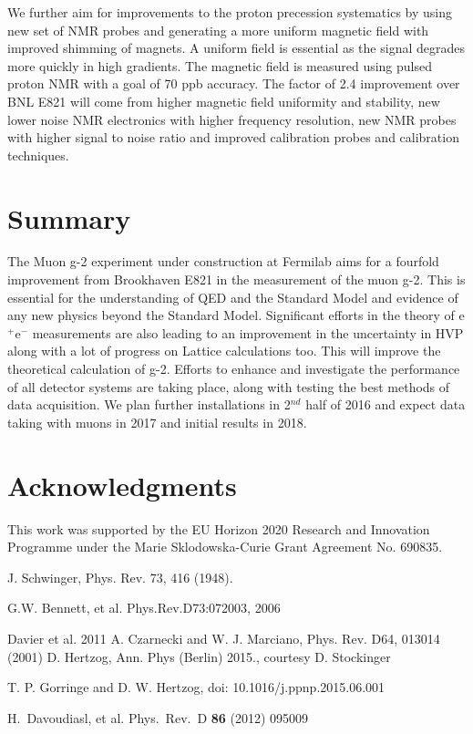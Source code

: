 \documentclass{article}
\begin{document}
We further aim for improvements to the proton precession systematics
by using new set of NMR probes and generating a more uniform magnetic
field with improved shimming of magnets.
A uniform field is essential as the signal degrades more quickly in high gradients. 
The magnetic field is measured using pulsed proton NMR with a goal of 70 ppb accuracy.
The factor of 2.4 improvement over BNL E821 will come from higher magnetic field uniformity and stability,
new lower noise NMR electronics with higher frequency resolution,
new NMR probes with higher signal to noise ratio 
and improved calibration probes and calibration techniques.
\section{Summary}
The Muon g-2 experiment under construction at Fermilab aims for a fourfold improvement from Brookhaven E821 
in the measurement of the muon g-2. This is essential for the understanding
of QED and the Standard Model and evidence of any new physics beyond the Standard Model. 
Significant efforts in the theory of e$^+$e$^-$ measurements are also leading to an
improvement in the uncertainty in HVP along with a lot of progress on Lattice
calculations too. This will improve the theoretical calculation of g-2. Efforts 
to enhance and investigate the performance of all detector systems are taking place,
along with testing the best methods of data acquisition. We plan further installations 
in 2$^{nd}$ half of 2016 and expect data taking with muons in 2017 and initial results
in 2018. 


\section*{Acknowledgments}
This work was supported by the EU Horizon 2020 Research and Innovation Programme under the
Marie Sklodowska-Curie Grant Agreement No. 690835.

\begin{thebibliography}{99}
J. Schwinger, Phys. Rev. 73, 416 (1948).
  
G.W. Bennett, et al. Phys.Rev.D73:072003, 2006

Davier et al. 2011
A. Czarnecki and W. J. Marciano, Phys. Rev. D64,
013014 (2001)
D. Hertzog, Ann. Phys (Berlin) 2015., courtesy D. Stockinger

T. P. Gorringe and D. W. Hertzog, doi: 10.1016/j.ppnp.2015.06.001

 H.~Davoudiasl, et al. Phys.\ Rev.\ D {\bf 86} (2012) 095009



\end{thebibliography}
%
\end{document}
